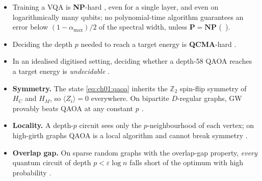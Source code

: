 \documentclass[handoutsbeamer.tex]{subfiles}
\begin{document}
\begin{frame}
\begin{itemize}\setlength\itemsep{0.3em}
    \item Training a VQA is \textbf{NP}-hard \citep{bittel2021training}, even for a single layer, and even on logarithmically many qubits; no polynomial-time algorithm guarantees an error below $(1-\alpha_{\max})/2$ of the spectral width, unless $\mathbf P = \mathbf{NP}$ (\Chap~).
    \item Deciding the depth $p$ needed to reach a target energy is \textbf{QCMA}-hard \citep{bittelQCMA}.
    \item In an idealised digitised setting, deciding whether a depth-58 QAOA reaches a target energy is \emph{undecidable} \citep{korpas2025undecidable}.
\end{itemize}
\end{frame}

\begin{frame}
\begin{itemize}\setlength\itemsep{0.3em}
    \item \textbf{Symmetry.} The state \eqref{eq:ch01:qaoa} inherits the $\mathbb{Z}_2$ spin-flip symmetry of $H_C$ and $H_M$, so $\langle Z_i\rangle = 0$ everywhere. On bipartite $D$-regular graphs, GW provably beats QAOA at any constant $p$ \citep{Bravyi2020}.
    \item \textbf{Locality.} A depth-$p$ circuit sees only the $p$-neighbourhood of each vertex; on high-girth graphs QAOA is a local algorithm and cannot break symmetry \citep{BravyiKlieschKoenigTang2022,BarakMarwaha2022}.
    \item \textbf{Overlap gap.} On sparse random graphs with the overlap-gap property, \emph{every} quantum circuit of depth $p < \varepsilon \log n$ falls short of the optimum with high probability \citep{ChouLoveSandhuShi2021,ChenHuangMarwaha2023}.
\end{itemize}
\end{frame}
\end{document}
